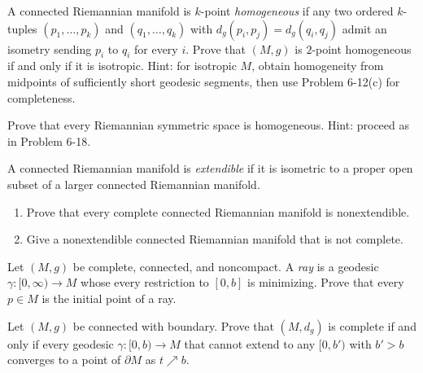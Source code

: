 \begin{exercise}
\label{prob:k-point-homogeneous}

A connected Riemannian manifold is $k$-point \emph{homogeneous} if any two
ordered $k$-tuples $(p_1,\ldots,p_k)$ and $(q_1,\ldots,q_k)$ with
$d_g(p_i,p_j)=d_g(q_i,q_j)$ admit an isometry sending $p_i$ to $q_i$ for every
$i$.  Prove that $(M,g)$ is $2$-point homogeneous if and only if it is
isotropic.  Hint: for isotropic $M$, obtain homogeneity from midpoints of
sufficiently short geodesic segments, then use Problem 6-12(c) for
completeness.
\end{exercise}

\begin{exercise}
\label{prob:symmetric-space-homogeneous}

Prove that every Riemannian symmetric space is homogeneous.  Hint: proceed as
in Problem 6-18.
\end{exercise}

\begin{exercise}
\label{prob:extendible}

A connected Riemannian manifold is \emph{extendible} if it is isometric to a
proper open subset of a larger connected Riemannian manifold.
\begin{enumerate}
\item[(a)] Prove that every complete connected Riemannian manifold is
nonextendible.
\item[(b)] Give a nonextendible connected Riemannian manifold that is not
complete.
\end{enumerate}
\end{exercise}

\begin{exercise}
\label{prob:ray-definition}

Let $(M,g)$ be complete, connected, and noncompact.  A \emph{ray} is a
geodesic $\gamma:[0,\infty)\to M$ whose every restriction to $[0,b]$ is
minimizing.  Prove that every $p\in M$ is the initial point of a ray.
\end{exercise}

\begin{exercise}
\label{prob:manifold-boundary-complete}

Let $(M,g)$ be connected with boundary.  Prove that $(M,d_g)$ is complete if
and only if every geodesic $\gamma:[0,b)\to M$ that cannot extend to any
$[0,b')$ with $b'>b$ converges to a point of $\partial M$ as $t\nearrow b$.
\end{exercise}

